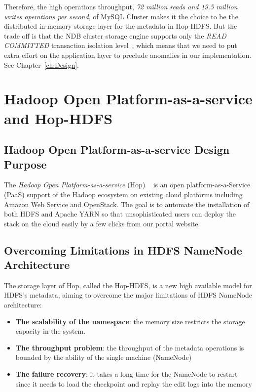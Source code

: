 \noindent Therefore, the high operations throughput, \textit{72 million reads and 19.5 million writes operations per second}, of MySQL Cluster makes it the choice to be the distributed in-memory storage layer for the metadata in Hop-HDFS. But the trade off is that the NDB cluster storage engine supports only the \textit{READ COMMITTED} transaction isolation level~\cite{mysqlreadcommited}, which means that we need to put extra effort on the application layer to preclude anomalies in our implementation. See Chapter~\ref{ch:Design}.

\section{Hadoop Open Platform-as-a-service and Hop-HDFS}
\label{sc:Hop-HDFS}
\subsection{Hadoop Open Platform-as-a-service Design Purpose}
The \textit{Hadoop Open Platform-as-a-service} (Hop) ~\cite{hop} is an open platform-as-a-Service (PaaS) support of the Hadoop ecosystem on existing cloud platforms including Amazon Web Service and OpenStack. The goal is to automate the installation of both HDFS and Apache YARN so that unsophisticated users can deploy the stack on the cloud easily by a few clicks from our portal website. 

\subsection{Overcoming Limitations in HDFS NameNode Architecture}

\noindent The storage layer of Hop, called the Hop-HDFS, is a new high available model for HDFS's metadata, aiming to overcome the major limitations of HDFS NameNode architecture:

\begin{itemize}[noitemsep]
	\item \textbf{The scalability of the namespace}: the memory size restricts the storage capacity in the system.
	\item \textbf{The throughput problem}: the throughput of the metadata operations is bounded by the ability of the single machine (NameNode)
	\item \textbf{The failure recovery}: it takes a long time for the NameNode to restart since it needs to load the checkpoint and replay the edit logs into the memory
\end{itemize}

